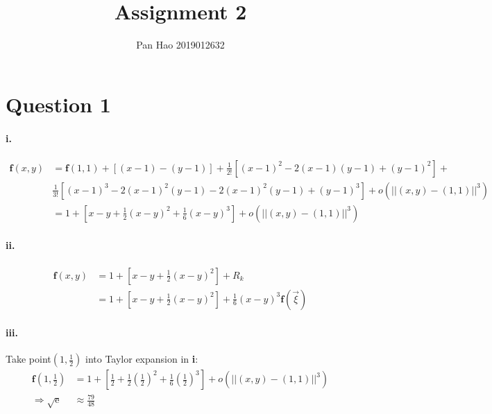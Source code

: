 \documentclass[11pt, a4paper]{article}
\begin{document}
\title{Assignment 2}
\author{Pan Hao 2019012632}
\maketitle
\section*{Question 1}
\paragraph{i.}
$$\begin{aligned}
    \bm{f}(x, y) &= \bm{f}(1, 1) + [(x - 1) - (y - 1)] + \frac{1}{2!}[(x - 1) ^ 2 - 2(x - 1)(y - 1) + (y - 1) ^ 2] + \\&\frac{1}{3!}[(x - 1) ^ 3 - 2(x - 1) ^ 2(y - 1) - 2(x - 1) ^ 2(y - 1) + (y - 1) ^ 3] + o(||(x, y) - (1, 1)|| ^ 3) \\
    &= 1 + [x - y + \frac{1}{2}(x - y) ^ 2 + \frac{1}{6}(x - y) ^ 3] + o(||(x, y) - (1, 1)|| ^ 3)
\end{aligned}$$
\paragraph{ii.}
$$\begin{aligned}
    \bm{f}(x, y) &= 1 + [x - y + \frac{1}{2}(x - y) ^ 2] + R_k \\
    &= 1 + [x - y + \frac{1}{2}(x - y) ^ 2] + \frac{1}{6}(x - y) ^ 3 \bm{f}(\vec{\xi})
\end{aligned}$$
\paragraph{iii.} Take point$(1, \frac{1}{2})$ into Taylor expansion in \textbf{i}:
$$\begin{aligned}
    \bm{f}(1, \frac{1}{2}) &= 1 + [\frac{1}{2} + \frac{1}{2}(\frac{1}{2}) ^ 2 + \frac{1}{6}(\frac{1}{2}) ^ 3] + o(||(x, y) - (1, 1)|| ^ 3)\\
    \Rightarrow
    \sqrt{\mathrm{e}} &\approx \frac{79}{48}
\end{aligned}$$
\end{document}
